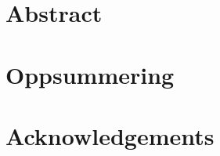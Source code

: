 \let\cleardoublepage\clearpage
\chapter*{Abstract}

\let\cleardoublepage\clearpage

\let\cleardoublepage\clearpage
\chapter*{Oppsummering}

\let\cleardoublepage\clearpage

\let\cleardoublepage\clearpage
\chapter*{Acknowledgements}

\let\cleardoublepage\clearpage